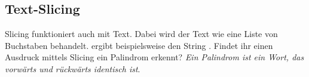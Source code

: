 \subsection{Text-Slicing }

Slicing funktioniert auch mit Text. Dabei wird der Text wie eine Liste von
Buchstaben behandelt.  ergibt beispielsweise den
String . Findet ihr einen Ausdruck mittels Slicing ein
Palindrom erkennt? \textit{Ein Palindrom ist ein Wort, das vorwärts und rückwärts
identisch ist}.
